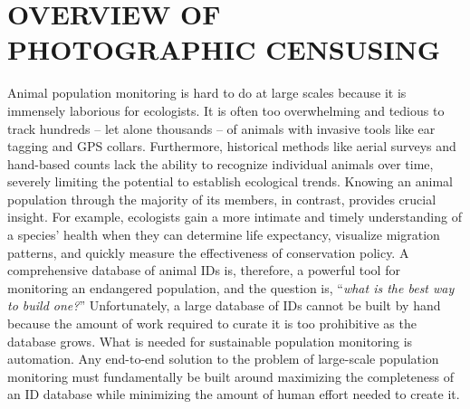 \chapter{OVERVIEW OF PHOTOGRAPHIC CENSUSING} \label{chapter:overview}

\noindent Animal population monitoring is hard to do at large scales because it is immensely laborious for ecologists.  It is often too overwhelming and tedious to track hundreds -- let alone thousands -- of animals with invasive tools like ear tagging and GPS collars.  Furthermore, historical methods like aerial surveys and hand-based counts lack the ability to recognize individual animals over time, severely limiting the potential to establish ecological trends.  Knowing an animal population through the majority of its members, in contrast, provides crucial insight.  For example, ecologists gain a more intimate and timely understanding of a species' health when they can determine life expectancy, visualize migration patterns, and quickly measure the effectiveness of conservation policy.  A comprehensive database of animal IDs is, therefore, a powerful tool for monitoring an endangered population, and the question is, ``\textit{what is the best way to build one?}''  Unfortunately, a large database of IDs cannot be built by hand because the amount of work required to curate it is too prohibitive as the database grows.  What is needed for sustainable population monitoring is automation.  Any end-to-end solution to the problem of large-scale population monitoring must fundamentally be built around maximizing the completeness of an ID database while minimizing the amount of human effort needed to create it.

